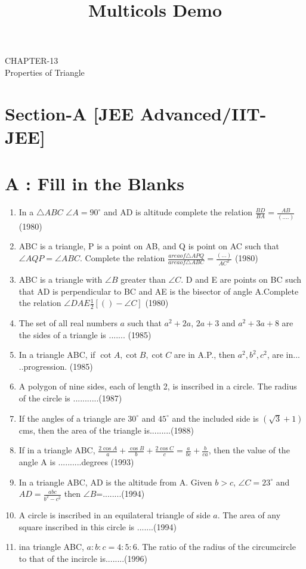 \documentclass[12pt]{article}
\title{Multicols Demo}
\begin{document}
\begin{center}
\textbf\large{CHAPTER-13 \\ Properties of Triangle}

\end{center}
\section*{Section-A    [JEE Advanced/IIT-JEE]}
\section*{A    :  Fill in the Blanks}
\begin{enumerate}
\item In a $\triangle ABC$ $\angle A=90^\circ$ and AD is altitude complete the relation
$\frac{BD}{BA}=\frac{AB}{(....)}$ (1980)
\item ABC is a triangle, P is a point on AB, and Q is point on AC
such that $\angle AQP= \angle ABC$. Complete the relation
$\frac{area of \triangle APQ}{area of \triangle ABC}=\frac{(...)}{AC^2}$ 
(1980)
\item ABC is a triangle with $\angle B$ greater than $\angle C$. D and E are points on BC such that AD is perpendicular to BC and AE is the bisector of angle A.Complete the relation $\angle DAE\frac{1}{2}[()-\angle C]$ (1980)
\item The set of all real numbers $a$ such that $a^2+ 2a$, $2a +3$ and 
$a^2+3a+8$ are the sides of a triangle is ....... (1985)
\item In a triangle ABC, if $\cot A, \cot B, \cot C$ are in A.P., then
$a^2,b^2,c^2$, are in... ..progression. (1985)
\item  A polygon of nine sides, each of length 2, is inscribed in a circle. The radius of the circle is ...........(1987)
\item If the angles of a triangle are $30^\circ$ and $45^\circ$ and the included side is $(\sqrt{3} +1)$cms, then the area of the triangle is.........(1988)
\item If in a triangle ABC, $\frac{2\cos A}{a}+\frac{\cos B}{b}+\frac{2\cos C}{c}=\frac{a}{bc}+\frac{b}{ca}$, then the value of the angle A is ..........degrees (1993)
\item In a triangle ABC, AD is the altitude from A. Given $b>c$,
$\angle C=23^\circ $ and $AD=\frac{abc}{b^2-c^2}$ then $\angle B$=........(1994)
\item A circle is inscribed in an equilateral triangle of side $a$. The
area of any square inscribed in this circle is .......(1994)
\item ina triangle ABC, $a:b:c=4:5:6$. The ratio of the radius of
the circumcircle to that of the incircle is........(1996)
\end{enumerate}
\end{document}
